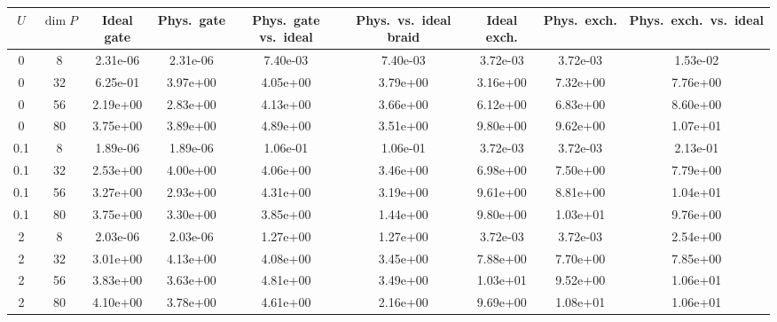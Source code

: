 \begin{tabular}{ccccccccc}
\hline
$U$ & $\dim P$ & Ideal gate & Phys.\ gate & Phys.\ gate vs.\ ideal & Phys.\ vs.\ ideal braid & Ideal exch. & Phys.\ exch. & Phys.\ exch.\ vs.\ ideal \\
\hline
0 & 8 & 2.31e-06 & 2.31e-06 & 7.40e-03 & 7.40e-03 & 3.72e-03 & 3.72e-03 & 1.53e-02 \\
0 & 32 & 6.25e-01 & 3.97e+00 & 4.05e+00 & 3.79e+00 & 3.16e+00 & 7.32e+00 & 7.76e+00 \\
0 & 56 & 2.19e+00 & 2.83e+00 & 4.13e+00 & 3.66e+00 & 6.12e+00 & 6.83e+00 & 8.60e+00 \\
0 & 80 & 3.75e+00 & 3.89e+00 & 4.89e+00 & 3.51e+00 & 9.80e+00 & 9.62e+00 & 1.07e+01 \\
\hline
0.1 & 8 & 1.89e-06 & 1.89e-06 & 1.06e-01 & 1.06e-01 & 3.72e-03 & 3.72e-03 & 2.13e-01 \\
0.1 & 32 & 2.53e+00 & 4.00e+00 & 4.06e+00 & 3.46e+00 & 6.98e+00 & 7.50e+00 & 7.79e+00 \\
0.1 & 56 & 3.27e+00 & 2.93e+00 & 4.31e+00 & 3.19e+00 & 9.61e+00 & 8.81e+00 & 1.04e+01 \\
0.1 & 80 & 3.75e+00 & 3.30e+00 & 3.85e+00 & 1.44e+00 & 9.80e+00 & 1.03e+01 & 9.76e+00 \\
\hline
2 & 8 & 2.03e-06 & 2.03e-06 & 1.27e+00 & 1.27e+00 & 3.72e-03 & 3.72e-03 & 2.54e+00 \\
2 & 32 & 3.01e+00 & 4.13e+00 & 4.08e+00 & 3.45e+00 & 7.88e+00 & 7.70e+00 & 7.85e+00 \\
2 & 56 & 3.83e+00 & 3.63e+00 & 4.81e+00 & 3.49e+00 & 1.03e+01 & 9.52e+00 & 1.06e+01 \\
2 & 80 & 4.10e+00 & 3.78e+00 & 4.61e+00 & 2.16e+00 & 9.69e+00 & 1.08e+01 & 1.06e+01 \\
\hline
\end{tabular}
